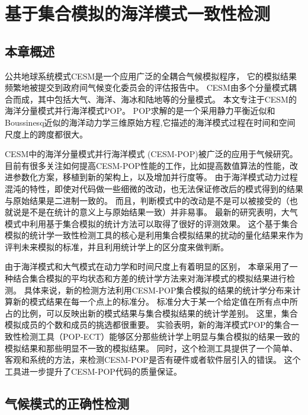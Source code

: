 \chapter{基于集合模拟的海洋模式一致性检测}
\label{cha:verify}

\section{本章概述}
\label{verify:intro}

公共地球系统模式CESM是一个应用广泛的全耦合气候模拟程序\cite{hurrell2013community}， 它的模拟结果频繁地被提交到政府间气候变化委员会的评估报告中\cite{stocker2013ipcc}。
CESM由多个分量模式耦合而成，其中包括大气、海洋、海冰和陆地等的分量模式。 
本文专注于CESM的海洋分量模式并行海洋模式POP。  
POP求解的是一个采用静力平衡近似和Boussinesq近似的海洋动力学三维原始方程,它描述的海洋模式过程在时间和空间尺度上的跨度都很大。  

CESM中的海洋分量模式并行海洋模式 (CESM-POP)被广泛的应用于气候研究。 
目前有很多关注如何提高CESM-POP性能的工作，比如提高数值算法的性能，改进参数化方案，移植到新的架构上，以及增加并行度等。 
由于海洋模式动力过程混沌的特性，即使对代码做一些细微的改动，也无法保证修改后的模式得到的结果与原始结果是二进制一致的。 
而且，判断模式中的改动是不是可以被接受的（也就说是不是在统计的意义上与原始结果一致）并非易事。 
最新的研究表明，大气模式中利用基于集合模拟的统计方法可以取得了很好的评测效果。
这个基于集合模拟的统计学一致性检测工具的核心是利用集合模拟结果的扰动的量化结果来作为评判未来模拟的标准，并且利用统计学上的区分度来做判断。 

由于海洋模式和大气模式在动力学和时间尺度上有着明显的区别，
本章采用了一种结合集合模拟的平均状态和方差的统计学方法来对海洋模式的模拟结果进行检测。 
具体来说，新的检测方法利用CESM-POP集合模拟的结果的统计学分布来计算新的模式结果在每一个点上的标准分。 
标准分大于某一个给定值在所有点中所占的比例，可以反映出新的模式结果与集合模拟结果的统计学差别。 
这里，集合模拟成员的个数和成员的挑选都很重要。
实验表明，新的海洋模式POP的集合一致性检测工具（POP-ECT）能够区分那些统计学上明显与集合模拟的结果一致的模拟结果和那些明显不一致的模拟结果。 
同时，这个检测工具提供了一个简单、客观和系统的方法，来检测CESM-POP是否有硬件或者软件层引入的错误。
这个工具进一步提升了CESM-POP代码的质量保证。 

\section{气候模式的正确性检测}
\label{verify:Backgroud}


